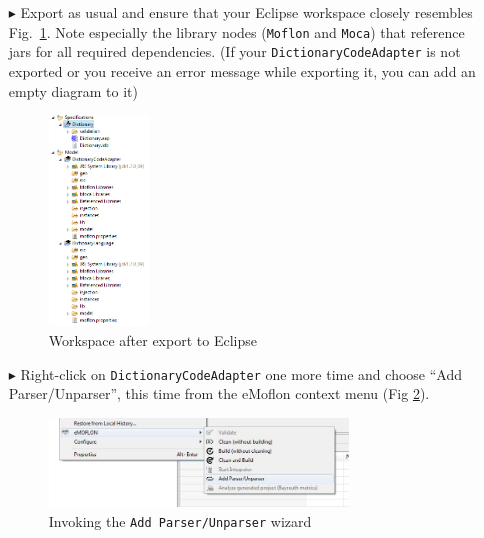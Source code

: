 \begin{enumerate}
\item[$\blacktriangleright$] Export as usual and ensure that your Eclipse workspace closely resembles Fig.~\ref{fig:moca-6-ExportToEclipse}.
Note especially the library nodes (\texttt{Moflon} and \texttt{Moca}) that reference jars for all required dependencies. (If your \texttt{DictionaryCodeAdapter} is not exported or you receive an error message while exporting it, you can add an empty diagram to it)

\begin{figure}[!htbp]
\begin{center}
 \includegraphics[width=0.25\textwidth]{pics/moca/1DictionaryMetaModel/6-ExportToEclipse.png}
  \caption{Workspace after export to Eclipse}
  \label{fig:moca-6-ExportToEclipse}
\end{center}
\end{figure}

\item[$\blacktriangleright$] Right-click on \texttt{DictionaryCodeAdapter} one more time and choose ``Add Parser/Unparser'', this time from the eMoflon context menu (Fig \ref{fig:moca-1-AddParserAndUnparserWizard}).

\begin{figure}[!htbp]
\begin{center}
 \includegraphics[width=0.75\textwidth]{pics/moca/2TextToMocaTree/1-AddParserAndUnparserWizard}
  \caption{Invoking the \texttt{Add Parser/Unparser} wizard} 
  \label{fig:moca-1-AddParserAndUnparserWizard}
\end{center}
\end{figure}
 

\end{enumerate}
